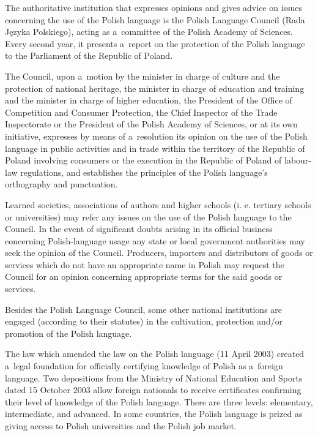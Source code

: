 \begin{multicols}{2}
The authoritative institution that expresses opinions and gives advice
on issues concerning the use of the Polish language is the Polish
Language Council (Rada Języka Polskiego), acting as a~committee of
the Polish Academy of Sciences. Every second year, it presents
a~report on the protection of the Polish language to the Parliament of
the Republic of Poland. 

The Council, upon a~motion by the minister in charge of culture and
the protection of national heritage, the minister in charge of
education and training and the minister in charge of higher education,
the President of the Office of Competition and Consumer Protection,
the Chief Inspector of the Trade Inspectorate or the President of the
Polish Academy of Sciences, or at its own initiative, expresses by
means of a~resolution its opinion on the use of the Polish language in
public activities and in trade within the territory of the Republic of
Poland involving consumers or the execution in the Republic of Poland
of labour-law regulations, and establishes the principles of the
Polish language’s orthography and punctuation. 

Learned societies, associations of authors and higher schools (i. e.
tertiary schools or universities) may refer any issues on the use of
the Polish language to the Council. In the event of significant doubts
arising in its official business concerning Polish-language usage any
state or local government authorities may seek the opinion of the
Council. Producers, importers and distributors of goods or services
which do not have an appropriate name in Polish may request the
Council for an opinion concerning appropriate terms for the said goods
or services. 

Besides the Polish Language Council, some other national institutions
are engaged (according to their statutes) in the cultivation,
protection and/or promotion of the Polish language. 

The law which amended the law on the Polish language (11 April 2003)
created a~legal foundation for officially certifying knowledge of
Polish as a~foreign language. Two depositions from the Ministry of
National Education and Sports dated 15 October 2003 allow foreign
nationals to receive certificates confirming their level of knowledge
of the Polish language. There are three levels: elementary,
intermediate, and advanced. In some countries, the Polish language is
prized as giving access to Polish universities and the Polish job
market. 



\end{multicols}
